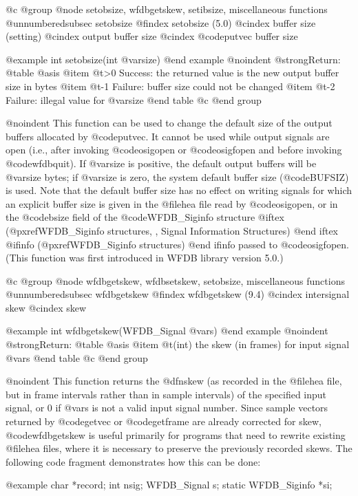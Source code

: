 {{{{{{{{{{@c @group
@node     setobsize, wfdbgetskew, setibsize, miscellaneous functions
@unnumberedsubsec setobsize
@findex setobsize (5.0)
@cindex buffer size (setting)
@cindex output buffer size
@cindex @code{putvec} buffer size

@example
int setobsize(int @var{size})
@end example
@noindent
@strong{Return:}
@table @asis
@item @t{>0}
Success: the returned value is the new output buffer size in bytes
@item @t{-1}
Failure: buffer size could not be changed
@item @t{-2}
Failure: illegal value for @var{size}
@end table
@c @end group

@noindent
This function can be used to change the default size of the output
buffers allocated by @code{putvec}.  It cannot be used while output
signals are open (i.e., after invoking @code{osigopen} or
@code{osigfopen} and before invoking @code{wfdbquit}).  If @var{size} is
positive, the default output buffers will be @var{size} bytes; if
@var{size} is zero, the system default buffer size (@code{BUFSIZ}) is
used.  Note that the default buffer size has no effect on writing
signals for which an explicit buffer size is given in the @file{hea}
file read by @code{osigopen}, or in the @code{bsize} field of the
@code{WFDB_Siginfo} structure
@iftex
(@pxref{WFDB_Siginfo structures, , Signal Information Structures})
@end iftex
@ifinfo
(@pxref{WFDB_Siginfo structures})
@end ifinfo
passed to @code{osigfopen}.
(This function was first introduced in WFDB library version 5.0.)

@c @group
@node     wfdbgetskew, wfdbsetskew, setobsize, miscellaneous functions
@unnumberedsubsec wfdbgetskew
@findex wfdbgetskew (9.4)
@cindex intersignal skew
@cindex skew

@example
int wfdbgetskew(WFDB_Signal @var{s})
@end example
@noindent
@strong{Return:}
@table @asis
@item @t{(int)}
the skew (in frames) for input signal @var{s}
@end table
@c @end group

@noindent
This function returns the @dfn{skew} (as recorded in the @file{hea}
file, but in frame intervals rather than in sample intervals) of the
specified input signal, or 0 if @var{s} is not a valid input signal
number.  Since sample vectors returned by @code{getvec} or
@code{getframe} are already corrected for skew, @code{wfdbgetskew} is
useful primarily for programs that need to rewrite existing
@file{hea} files, where it is necessary to preserve the previously
recorded skews.  The following code fragment demonstrates how this can
be done:

@example
char *record;
int nsig;
WFDB_Signal s;
static WFDB_Siginfo *si;

}}}}}}}}}}
